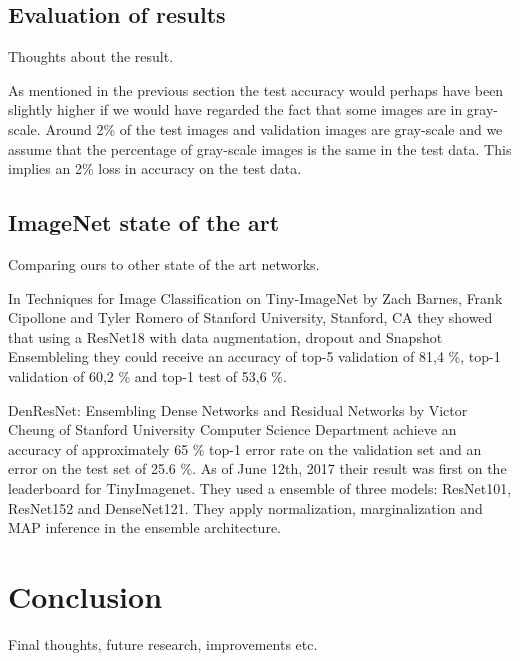 \documentclass{kthreport}
\begin{document}
\subsection{Evaluation of results}

Thoughts about the result.

As mentioned in the previous section the test accuracy would perhaps have been slightly higher if we would have regarded the fact that some images are in gray-scale. Around 2\% of the test images and validation images are gray-scale and we assume that the percentage of gray-scale images is the same in the test data. This implies an 2\% loss in accuracy on the test data.

\subsection{ImageNet state of the art}

Comparing ours to other state of the art networks.

In Techniques for Image Classification on Tiny-ImageNet by Zach Barnes, Frank Cipollone and Tyler Romero of Stanford University, Stanford, CA they showed that using a ResNet18 with data augmentation, dropout and Snapshot Ensembleling they could receive an accuracy of top-5 validation of 81,4 \%, top-1 validation of 60,2 \% and top-1 test of 53,6 \%.


DenResNet: Ensembling Dense Networks and Residual Networks by Victor Cheung of Stanford University Computer Science Department achieve an accuracy of approximately 65 \% top-1 error rate on the validation set and an error on the test set of 25.6 \%. As of June 12th, 2017 their result was first on the leaderboard for TinyImagenet. They used a  ensemble of three models: ResNet101, ResNet152 and DenseNet121. They apply normalization, marginalization and MAP inference in the ensemble architecture.

\section{Conclusion}
Final thoughts, future research, improvements etc.



{}

\end{document}
